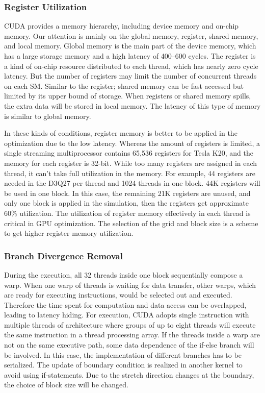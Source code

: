 \documentclass[10pt]{elsarticle}
\begin{document}
\subsubsection{Register Utilization}
CUDA provides a memory hierarchy, including device memory and on-chip memory. Our attention is mainly on the global memory, register, shared memory, and local memory. Global memory is the main part of the device memory, which has a large storage memory and a high latency of 400--600 cycles\cite{rf:Power14}. The register is a kind of on-chip resource distributed to each thread, which has nearly zero cycle latency. But the number of registers may limit the number of concurrent threads on each SM. Similar to the register; shared memory can be fast accessed but limited by its upper bound of storage. When registers or shared memory spills, the extra data will be stored in local memory.  The latency of this type of memory is similar to global memory. 

In these kinds of conditions, register memory is better to be applied in the optimization due to the low latency. Whereas the amount of registers is limited, a single streaming multiprocessor contains 65,536 registers for Tesla K20, and the memory for each register is 32-bit. While too many registers are assigned in each thread, it can’t take full utilization in the memory. For example, 44 registers are needed in the D3Q27 per thread and 1024 threads in one block. 44K registers will be used in one block. In this case, the remaining 21K registers are unused, and only one block is applied in the simulation, then the registers get approximate 60\% utilization. The utilization of register memory effectively in each thread is critical in GPU optimization. The selection of the grid and block size is a scheme to get higher register memory utilization. 
\subsubsection{Branch Divergence Removal}
During the execution, all 32 threads inside one block sequentially compose a warp. When one warp of threads is waiting for data transfer, other warps, which are ready for executing instructions, would be selected out and executed. Therefore the time spent for computation and data access can be overlapped, leading to latency hiding. For execution, CUDA adopts single instruction with multiple threads of architecture where groups of up to eight threads will execute the same instruction in a thread processing array. If the threads inside a warp are not on the same executive path, some data dependence of the if-else branch will be involved. In this case, the implementation of different branches has to be serialized. The update of boundary condition is realized in another kernel to avoid using if-statements. Due to the stretch direction changes at the boundary, the choice of block size will be changed.
\end{document}
